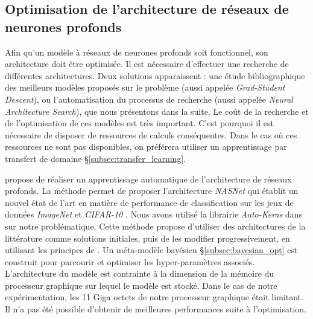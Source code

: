 \subsection{Optimisation de l'architecture de réseaux de neurones profonds} \label{subsec:nas}
Afin qu'un modèle à réseaux de neurones profonds soit fonctionnel, son architecture doit être optimisée.
Il est nécessaire d'effectuer une recherche de différentes architectures.
Deux solutions apparaissent : une étude bibliographique des meilleurs modèles proposés sur le problème (aussi appelée \textit{Grad-Student Descent}), ou l'automatisation du processus de recherche (aussi appelée \textit{Neural Architecture Search}), que nous présentons dans la suite.
Le coût de la recherche et de l'optimisation de ces modèles est très important.
C'est pourquoi il est nécessaire de disposer de ressources de calculs conséquentes.
Dans le cas où ces ressources ne sont pas disponibles, on préférera utiliser un apprentissage par transfert de domaine §\ref{subsec:transfer_learning}.

\cite{zoph_neural_2016} propose de réaliser un apprentissage automatique de l'architecture de réseaux profonds.
La méthode permet de proposer l'architecture \textit{NASNet} \cite{zoph_learning_2017} qui établit un nouvel état de l'art en matière de performance de classification sur les jeux de données \textit{ImageNet} et \textit{CIFAR-10} \cite{krizhevsky2009learning}.
Nous avons utilisé la librairie \textit{Auto-Keras} \cite{jin_autokeras_2018} dans \cite{nagorny_polarimetric_2019} sur notre problématique.
Cette méthode propose d'utiliser des architectures de la littérature comme solutions initiales, puis de les modifier progressivement, en utilisant les principes de \cite{zoph_neural_2016}.
Un méta-modèle bayésien §\ref{subsec:bayesian_opt} est construit pour parcourir et optimiser les hyper-paramètres associés.
L'architecture du modèle est contrainte à la dimension de la mémoire du processeur graphique sur lequel le modèle est stocké.
Dans le cas de notre expérimentation, les 11 Giga octets de notre processeur graphique était limitant.
Il n'a pas été possible d'obtenir de meilleures performances suite à l'optimisation.

